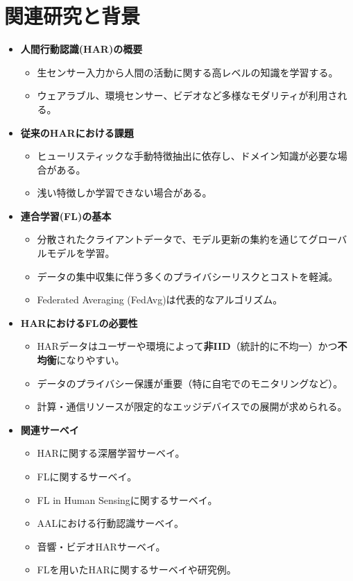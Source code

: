 \documentclass[unicode,12pt,aspectratio=169, dvipdfmx]{beamer}
\begin{document}
\section{関連研究と背景}
\begin{frame}{\insertsectionhead}
    \begin{itemize}
        \item \textbf{人間行動認識(HAR)の概要}
        \begin{itemize}
            \item 生センサー入力から人間の活動に関する高レベルの知識を学習する。
            \item ウェアラブル、環境センサー、ビデオなど多様なモダリティが利用される。
        \end{itemize}
        \item \textbf{従来のHARにおける課題}
        \begin{itemize}
            \item ヒューリスティックな手動特徴抽出に依存し、ドメイン知識が必要な場合がある。
            \item 浅い特徴しか学習できない場合がある。
        \end{itemize}
        \item \textbf{連合学習(FL)の基本}
        \begin{itemize}
            \item 分散されたクライアントデータで、モデル更新の集約を通じてグローバルモデルを学習。
            \item データの集中収集に伴う多くのプライバシーリスクとコストを軽減。
            \item Federated Averaging (FedAvg)は代表的なアルゴリズム。
        \end{itemize}
        \item \textbf{HARにおけるFLの必要性}
        \begin{itemize}
            \item HARデータはユーザーや環境によって\textbf{非IID}（統計的に不均一）かつ\textbf{不均衡}になりやすい。
            \item データのプライバシー保護が重要（特に自宅でのモニタリングなど）。
            \item 計算・通信リソースが限定的なエッジデバイスでの展開が求められる。
        \end{itemize}
        \item \textbf{関連サーベイ}
        \begin{itemize}
            \item HARに関する深層学習サーベイ。
            \item FLに関するサーベイ。
            \item FL in Human Sensingに関するサーベイ。
            \item AALにおける行動認識サーベイ。
            \item 音響・ビデオHARサーベイ。
            \item FLを用いたHARに関するサーベイや研究例。
        \end{itemize}
    \end{itemize}
\end{frame}
\end{document}
